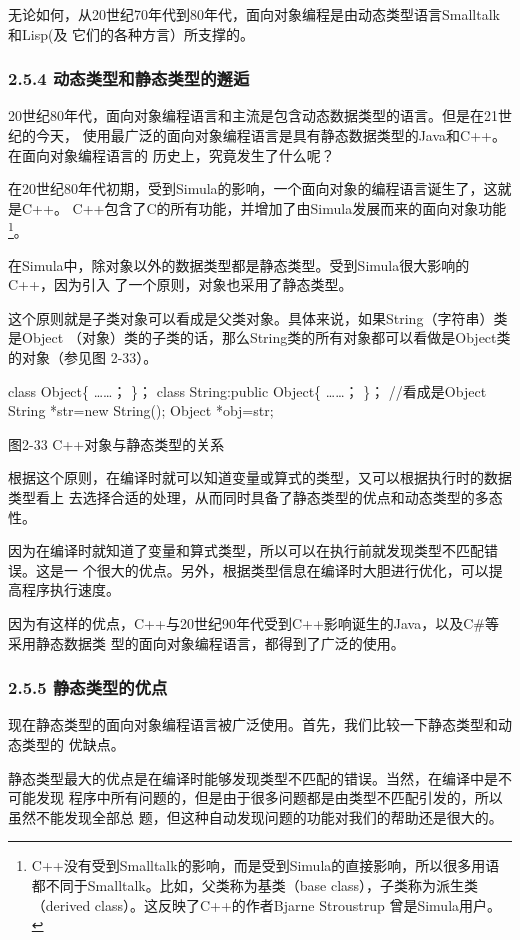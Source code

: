 \documentclass[11pt]{ctexart}
\begin{document}
无论如何，从20世纪70年代到80年代，面向对象编程是由动态类型语言Smalltalk和Lisp(及
它们的各种方言）所支撑的。
\subsubsection{2.5.4 动态类型和静态类型的邂逅}
\label{sec:orgb43fb15}

20世纪80年代，面向对象编程语言和主流是包含动态数据类型的语言。但是在21世纪的今天，
使用最广泛的面向对象编程语言是具有静态数据类型的Java和C++。在面向对象编程语言的
历史上，究竟发生了什么呢？

在20世纪80年代初期，受到Simula的影响，一个面向对象的编程语言诞生了，这就是C++。
C++包含了C的所有功能，并增加了由Simula发展而来的面向对象功能\footnote{C++没有受到Smalltalk的影响，而是受到Simula的直接影响，所以很多用语
都不同于Smalltalk。比如，父类称为基类（base class），子类称为派生类（derived
class）。这反映了C++的作者Bjarne Stroustrup 曾是Simula用户。}。

在Simula中，除对象以外的数据类型都是静态类型。受到Simula很大影响的C++，因为引入
了一个原则，对象也采用了静态类型。

这个原则就是子类对象可以看成是父类对象。具体来说，如果String（字符串）类是Object
（对象）类的子类的话，那么String类的所有对象都可以看做是Object类的对象（参见图
2-33）。

class Object\{
  ……；
\}；
class String:public Object\{
  ……；
\}；
//看成是Object
String *str=new String();
Object *obj=str;

图2-33 C++对象与静态类型的关系

根据这个原则，在编译时就可以知道变量或算式的类型，又可以根据执行时的数据类型看上
去选择合适的处理，从而同时具备了静态类型的优点和动态类型的多态性。

因为在编译时就知道了变量和算式类型，所以可以在执行前就发现类型不匹配错误。这是一
个很大的优点。另外，根据类型信息在编译时大胆进行优化，可以提高程序执行速度。

因为有这样的优点，C++与20世纪90年代受到C++影响诞生的Java，以及C\#等采用静态数据类
型的面向对象编程语言，都得到了广泛的使用。
\subsubsection{2.5.5 静态类型的优点}
\label{sec:org7874f36}

现在静态类型的面向对象编程语言被广泛使用。首先，我们比较一下静态类型和动态类型的
优缺点。

静态类型最大的优点是在编译时能够发现类型不匹配的错误。当然，在编译中是不可能发现
程序中所有问题的，但是由于很多问题都是由类型不匹配引发的，所以虽然不能发现全部总
题，但这种自动发现问题的功能对我们的帮助还是很大的。
\end{document}
